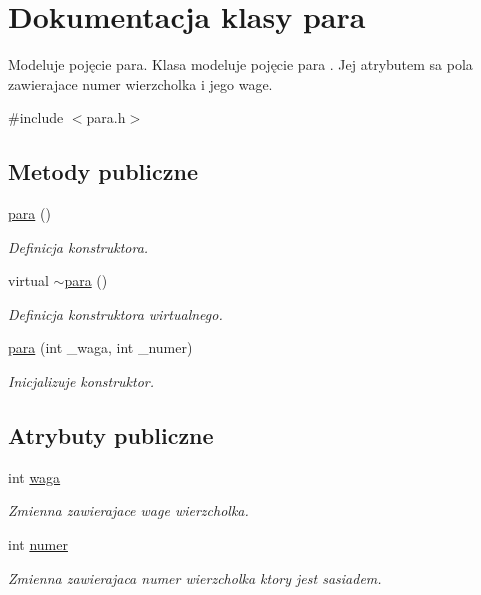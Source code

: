 \hypertarget{classpara}{\section{Dokumentacja klasy para}
\label{classpara}
}


Modeluje pojęcie para. Klasa modeluje pojęcie para . Jej atrybutem sa pola zawierajace numer wierzcholka i jego wage.  




{\ttfamily \#include $<$para.\-h$>$}

\subsection*{Metody publiczne}
\begin{DoxyCompactItemize}
\item 
\hyperlink{classpara_ad30c7566519da720cef8f4ebf68b2e48}{para} ()
\begin{DoxyCompactList}\small\item\em Definicja konstruktora. \end{DoxyCompactList}\item 
virtual \hyperlink{classpara_ab6157584ffc475598c972a6563b5e1d5}{$\sim$para} ()
\begin{DoxyCompactList}\small\item\em Definicja konstruktora wirtualnego. \end{DoxyCompactList}\item 
\hyperlink{classpara_a12765ab1f150bcd071ce65ab2fee5acf}{para} (int \-\_\-waga, int \-\_\-numer)
\begin{DoxyCompactList}\small\item\em Inicjalizuje konstruktor. \end{DoxyCompactList}\end{DoxyCompactItemize}
\subsection*{Atrybuty publiczne}
\begin{DoxyCompactItemize}
\item 
int \hyperlink{classpara_a6ccf50eedaaef6b86ec2c051af6ccf8d}{waga}
\begin{DoxyCompactList}\small\item\em Zmienna zawierajace wage wierzcholka. \end{DoxyCompactList}\item 
int \hyperlink{classpara_ad00013e542cdbfd535beca41cb8d1e1f}{numer}
\begin{DoxyCompactList}\small\item\em Zmienna zawierajaca numer wierzcholka ktory jest sasiadem. \end{DoxyCompactList}\end{DoxyCompactItemize}


